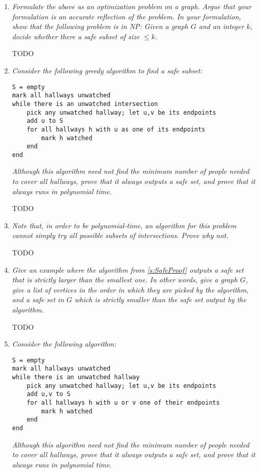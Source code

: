 \documentclass[12pt]{article} \setlength{\oddsidemargin}{0in}
\begin{document}
\begin{enumerate}
\item\textit{Formulate the above as an optimization problem on a graph. Argue that your formulation is an accurate reflection of the problem. In your formulation, show that the following problem is in NP: Given a graph $G$ and an integer $k$, decide whether there a safe subset of size $\leq k$.}

TODO

\item\textit{Consider the following greedy algorithm to find a safe subset:}
\begin{verbatim}
S = empty
mark all hallways unwatched
while there is an unwatched intersection
    pick any unwatched hallway; let u,v be its endpoints
    add u to S
    for all hallways h with u as one of its endpoints
        mark h watched
    end
end
\end{verbatim}
\textit{Although this algorithm need not find the minimum number of people needed to cover all hallways, prove that it always outputs a safe set, and prove that it always runs in polynomial time.}\label{s:SafeProof}

TODO

\item\textit{Note that, in order to be polynomial-time, an algorithm for this problem cannot simply try all possible subsets of intersections. Prove why not.}

TODO

\item\textit{Give an example where the algorithm from \ref{s:SafeProof} outputs a safe set that is strictly larger than the smallest one. In other words, give a graph $G$, give a list of vertices in the order in which they are picked by the algorithm, and a safe set in $G$ which is strictly smaller than the safe set output by the algorithm.}

TODO

\item\textit{Consider the following algorithm:}
\begin{verbatim}
S = empty
mark all hallways unwatched
while there is an unwatched hallway
    pick any unwatched hallway; let u,v be its endpoints
    add u,v to S
    for all hallways h with u or v one of their endpoints
        mark h watched
    end
end
\end{verbatim}
\textit{Although this algorithm need not find the minimum number of people needed to cover all hallways, prove that it always outputs a safe set, and prove that it always runs in polynomial time.}\label{s:SafeProof2}


\end{enumerate}
\end{document}
